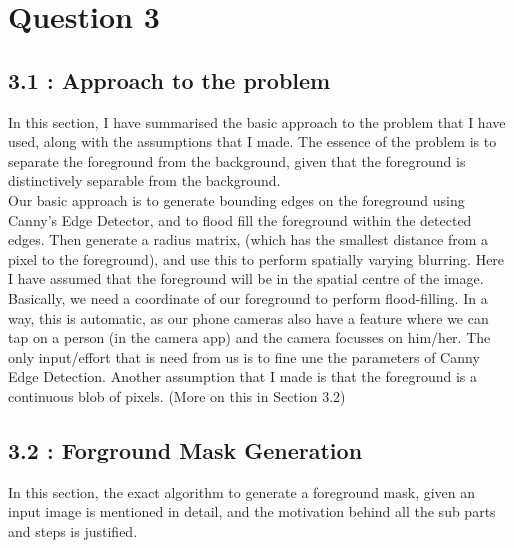 \documentclass[12pt, a4paper]{article}
\begin{document}
\vspace*{-22pt}
\section*{Question 3}
\subsection*{3.1 : Approach to the problem}
\quad In this section, I have summarised the basic approach to the problem that I have used, along with the assumptions that I made. The essence of the problem is to separate the foreground from the background, given that the foreground is distinctively separable from the background. \\
\null\quad Our basic approach is to generate bounding edges on the foreground using Canny's Edge Detector, and to flood fill the foreground within the detected edges. Then generate a radius matrix, (which has the smallest distance from a pixel to the foreground), and use this to perform spatially varying blurring. Here I have assumed that the foreground will be in the spatial centre of the image. Basically, we need a coordinate of our foreground to perform flood-filling. In a way, this is automatic, as our phone cameras also have a feature where we can tap on a person (in the camera app) and the camera focusses on him/her. The only input/effort that is need from us is to fine une the parameters of Canny Edge Detection. Another assumption that I made is that the foreground is a continuous blob of pixels. (More on this in Section 3.2)

\subsection*{3.2 : Forground Mask Generation}
\quad\quad In this section, the exact algorithm to generate a foreground mask, given an input image is mentioned in detail, and the motivation behind all the sub parts and steps is justified.
\end{document}
